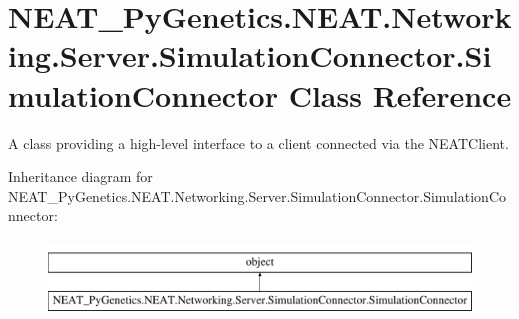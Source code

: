 \hypertarget{classNEAT__PyGenetics_1_1NEAT_1_1Networking_1_1Server_1_1SimulationConnector_1_1SimulationConnector}{}\section{N\+E\+A\+T\+\_\+\+Py\+Genetics.\+N\+E\+A\+T.\+Networking.\+Server.\+Simulation\+Connector.\+Simulation\+Connector Class Reference}
\label{classNEAT__PyGenetics_1_1NEAT_1_1Networking_1_1Server_1_1SimulationConnector_1_1SimulationConnector}


A class providing a high-\/level interface to a client connected via the N\+E\+A\+T\+Client.  


Inheritance diagram for N\+E\+A\+T\+\_\+\+Py\+Genetics.\+N\+E\+A\+T.\+Networking.\+Server.\+Simulation\+Connector.\+Simulation\+Connector\+:\begin{figure}[H]
\begin{center}
\leavevmode
\includegraphics[height=2.000000cm]{classNEAT__PyGenetics_1_1NEAT_1_1Networking_1_1Server_1_1SimulationConnector_1_1SimulationConnector}
\end{center}
\end{figure}
